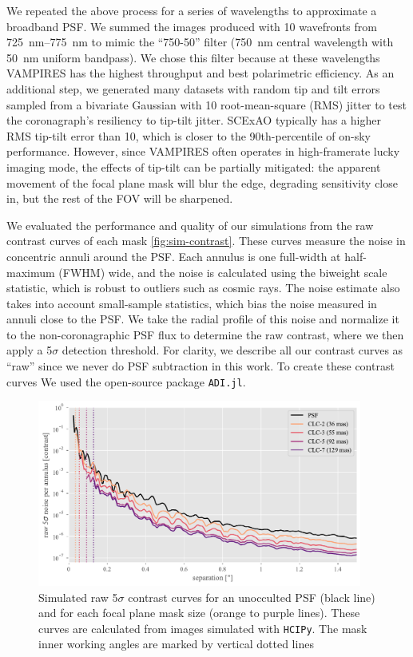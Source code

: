 \documentclass[]{spie}  %
\begin{document}
We repeated the above process for a series of wavelengths to approximate a broadband PSF. We summed the images produced with 10 wavefronts from \qtyrange{725}{775}{\nano\meter} to mimic the ``750-50'' filter (\qty{750}{\nano\meter} central wavelength with \qty{50}{\nano\meter} uniform bandpass). We chose this filter because at these wavelengths VAMPIRES has the highest throughput and best polarimetric efficiency. As an additional step, we generated many datasets with random tip and tilt errors sampled from a bivariate Gaussian with \qty{10}{\milliarcsecond} root-mean-square (RMS) jitter to test the coronagraph's resiliency to tip-tilt jitter. SCExAO typically has a higher RMS tip-tilt error than \qty{10}{\milliarcsecond}, which is closer to the 90th-percentile of on-sky performance. However, since VAMPIRES often operates in high-framerate lucky imaging mode, the effects of tip-tilt can be partially mitigated: the apparent movement of the focal plane mask will blur the edge, degrading sensitivity close in, but the rest of the FOV will be sharpened.

We evaluated the performance and quality of our simulations from the raw contrast curves of each mask \autoref{fig:sim-contrast}. These curves measure the noise in concentric annuli around the PSF. Each annulus is one full-width at half-maximum (FWHM) wide, and the noise is calculated using the biweight scale statistic, which is robust to outliers such as cosmic rays. The noise estimate also takes into account small-sample statistics\cite{mawet2014}, which bias the noise measured in annuli close to the PSF. We take the radial profile of this noise and normalize it to the non-coronagraphic PSF flux to determine the raw contrast, where we then apply a 5$\sigma$ detection threshold. For clarity, we describe all our contrast curves as ``raw'' since we never do PSF subtraction in this work. To create these contrast curves We used the open-source package \texttt{ADI.jl}\cite{lucas2020}.

\begin{figure}
   \centering
   \includegraphics[width=0.95\textwidth]{figures/simulated_curves}
   \caption{Simulated raw 5$\sigma$ contrast curves for an unocculted PSF (black line) and for each focal plane mask size (orange to purple lines). These curves are calculated from images simulated with \texttt{HCIPy}. The mask inner working angles are marked by vertical dotted lines}\label{fig:sim-contrast}
\end{figure}
\end{document}
